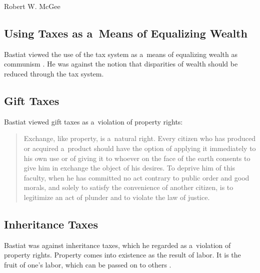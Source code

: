 \begin{artengenv}{Robert W. McGee}
\subsection{Using Taxes as a~Means of Equalizing Wealth }



Bastiat viewed the use of the tax system as a~means of equalizing wealth as communism 
\parencite[][p.111]{bastiat_selected_1964}. %
 He was against the notion that disparities of wealth should be reduced through the tax system.



\subsection{Gift Taxes }



Bastiat viewed gift taxes as a~violation of property rights:



\begin{quote}
Exchange, like property, is a~natural right. Every citizen who has produced or acquired a~product should have the option of applying it immediately to his own use or of giving it to whoever on the face of the earth consents to give him in exchange the object of his desires. To deprive him of this faculty, when he has committed no act contrary to public order and good morals, and solely to satisfy the convenience of another citizen, is to legitimize an act of plunder and to violate the law of justice. 
\parencite[][p.112]{bastiat_selected_1964}%
\end{quote}




\subsection{Inheritance Taxes }



Bastiat was against inheritance taxes, which he regarded as a~violation of property rights. Property comes into existence as the result of labor. It is the fruit of one's labor, which can be passed on to others 
\parencite[][pp.188–193]{bastiat_selected_1964}.%





\end{artengenv}
